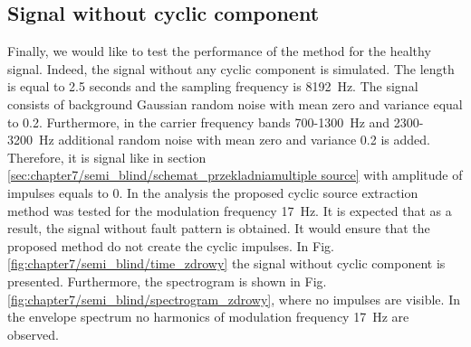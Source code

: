 \subsection{Signal without cyclic component}
Finally, we would like to test the performance of the method for the healthy signal. Indeed, the signal without any cyclic component is simulated. The length is equal to 2.5 seconds and the sampling frequency is 8192~Hz. The signal consists of background Gaussian random noise with mean zero and variance equal to 0.2. Furthermore, in the carrier frequency bands 700-1300~Hz and 2300-3200~Hz additional random noise with mean zero and variance  0.2 is added. Therefore, it is signal like in section \ref{sec:chapter7/semi_blind/schemat_przekladniamultiple source} with amplitude of impulses equals to 0. In the analysis the proposed cyclic source extraction method was tested for the modulation frequency 17~Hz. It is expected that as a result, the signal without fault pattern is obtained. It would ensure that the proposed method do not create the cyclic impulses. In Fig. \ref{fig:chapter7/semi_blind/time_zdrowy} the signal without cyclic component is presented. Furthermore, the spectrogram is shown in Fig. \ref{fig:chapter7/semi_blind/spectrogram_zdrowy}, where no impulses are visible. In the envelope spectrum no harmonics of modulation frequency 17~Hz are observed. 
